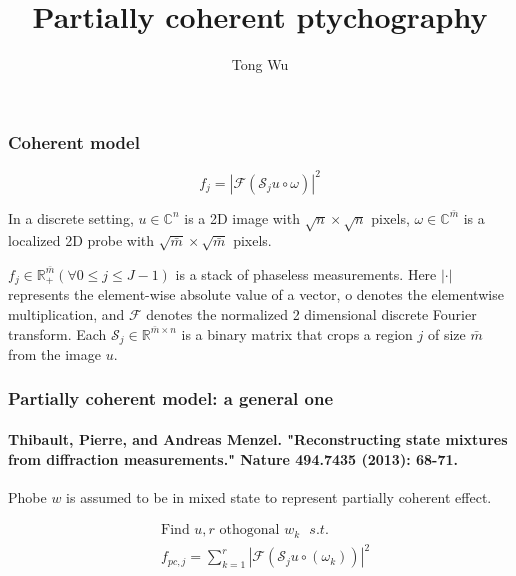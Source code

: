\documentclass[UTF8]{beamer}
\author{Tong Wu}
\title{Partially coherent ptychography}
\begin{document}
\frame{\titlepage}


\begin{frame}[c]\frametitle{Coherent model}


\begin{equation}
\label{basic}
f_{j}=\left|\mathcal{F}\left( \mathcal{S}_{j} u  \circ \omega \right)\right|^{2} 
\end{equation}

In a discrete setting, $u \in \mathbb{C}^{n}$ is a 2D image with $\sqrt{n} \times \sqrt{n}$ pixels, $\omega \in \mathbb{C}^{\bar{m}}$ is a localized 2D probe with $\sqrt{\bar{m}} \times \sqrt{\bar{m}}$ pixels.

$f_{j} \in \mathbb{R}_{+}^{\bar{m}}(\forall 0 \leq j \leq J-1)$ is a stack of phaseless measurements. Here $|\cdot|$ represents the element-wise absolute value of a vector, o denotes the elementwise multiplication, and $\mathcal{F}$ denotes the normalized 2 dimensional discrete Fourier transform. Each $\mathcal{S}_{j} \in \mathbb{R}^{\bar{m} \times n}$ is a binary matrix that crops a region $j$ of size $\bar{m}$ from the image $u$.


\end{frame}

\begin{frame}[c]\frametitle{Partially coherent model: a general one}
\framesubtitle{Thibault, Pierre, and Andreas Menzel. "Reconstructing state mixtures from diffraction measurements." Nature 494.7435 (2013): 68-71.}




Phobe $w$ is assumed to be in mixed state to represent partially coherent effect.

\begin{equation}
\label{model:sep} 
\begin{aligned}
&\mbox{Find } u, r \mbox{ othogonal $w_k$   }s.t. \\
&f_{p c, j}=\sum_{k=1}^r \left|\mathcal{F}\left( \mathcal{S}_{j} u \circ \left(\omega_k\right) \right)\right|^{2}  
\end{aligned}
\end{equation}


\end{frame}
\end{document}
